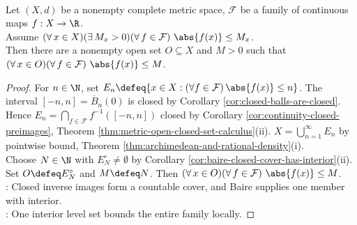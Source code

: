 \begin{theorem} \label{thm:baire-local-uniform-boundedness-continuous-family} \\
Let $(X,d)$ be a nonempty complete metric space, $\mathcal{F}$ be a family of continuous maps $f:X\to\R$.\\
Assume $(\forall\,x\in X)(\exists\,M_x>0)(\forall\,f\in\mathcal{F})\ \abs{f(x)}\leq M_x$.\\
Then there are a nonempty open set $O\subseteq X$ and $M>0$ such that $(\forall\,x\in O)(\forall\,f\in\mathcal{F})\ \abs{f(x)}\leq M$.
\begin{proof}
For $n\in\N$, set $E_n\defeq\{x\in X:(\forall f\in\mathcal{F})\,\abs{f(x)}\leq n\}$. The interval $[-n,n]=\overline{B}_n(0)$ is closed by Corollary \ref{cor:closed-balls-are-closed}.\\
Hence $E_n=\bigcap\limits_{f\in\mathcal{F}}f^{-1}([-n,n])$ closed by Corollary \ref{cor:continuity-closed-preimages}, Theorem \ref{thm:metric-open-closed-set-calculus}(ii). $X=\bigcup\limits_{n=1}^{\infty}E_n$ by pointwise bound, Theorem \ref{thm:archimedean-and-rational-density}(i).\\
Choose $N\in\N$ with $E_N^\circ\neq\emptyset$ by Corollary \ref{cor:baire-closed-cover-has-interior}(ii). Set $O\defeq E_N^\circ$ and $M\defeq N$. Then $(\forall\,x\in O)(\forall\,f\in\mathcal{F})\ \abs{f(x)}\leq M$.\\
: Closed inverse images form a countable cover, and Baire supplies one member with interior.\\
: One interior level set bounds the entire family locally.
\end{proof}
\end{theorem}


